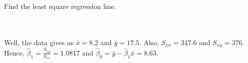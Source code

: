 Find the least square regression line.\\\\

\begin{solution}\renewcommand{\qedsymbol}{}\ \\
    Well, the data gives us $\bar{x}=8.2$ and $\bar{y}=17.5$. Also, $S_{xx}=347.6$ and $S_{xy}=376$.
    Hence, $\hat{\beta}_1=\frac{S_{xy}}{S_{xx}}=1.0817$ and
    $\hat{\beta}_0=\bar{y}-\hat{\beta}_1\bar{x}=8.63$.

\end{solution}